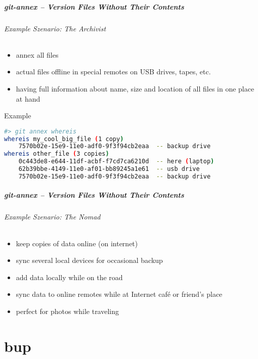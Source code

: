 \documentclass[english,hyperref={pdfpagelabels=false},aspectratio=169]{beamer}
\begin{document}
\begin{frame}[fragile]
  \frametitle{git-annex -- Version Files Without Their Contents}
  \framesubtitle{Example Szenario: The Archivist}
  \begin{itemize}
    \item annex all files
    \item actual files offline in special remotes on USB drives, tapes, etc.
    \item having full information about name, size and location of all files in one place at hand
  \end{itemize}
  
  \begin{block}{Example}
    \scriptsize
    \begin{lstlisting}[language=bash,basicstyle=\scriptsize\ttfamily,commentstyle=\normalfont\ttfamily\color{fzjgray50}]
#> git annex whereis
whereis my_cool_big_file (1 copy)
    7570b02e-15e9-11e0-adf0-9f3f94cb2eaa  -- backup drive
whereis other_file (3 copies)
    0c443de8-e644-11df-acbf-f7cd7ca6210d  -- here (laptop)
    62b39bbe-4149-11e0-af01-bb89245a1e61  -- usb drive
    7570b02e-15e9-11e0-adf0-9f3f94cb2eaa  -- backup drive
    \end{lstlisting}
  \end{block}
\end{frame}

\begin{frame}
  \frametitle{git-annex -- Version Files Without Their Contents}
  \framesubtitle{Example Szenario: The Nomad}
  \begin{itemize}
    \item keep copies of data online (on internet)
    \item sync several local devices for occasional backup
    \item add data locally while on the road
    \item sync data to online remotes while at Internet café or friend's place
    \item perfect for photos while traveling
  \end{itemize}
\end{frame}



\part{bup}
\makepart
\end{document}
